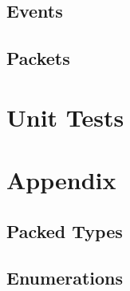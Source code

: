 

\subsection{Events}



\subsection{Packets}



\section{Unit Tests}



\section{Appendix}
\subsection{Packed Types}



\subsection{Enumerations}




